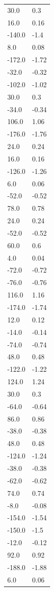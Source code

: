 \begin{longtable}{ll}
30.0 & 0.3 \\
16.0 & 0.16 \\
-140.0 & -1.4 \\
8.0 & 0.08 \\
-172.0 & -1.72 \\
-32.0 & -0.32 \\
-102.0 & -1.02 \\
30.0 & 0.3 \\
-34.0 & -0.34 \\
106.0 & 1.06 \\
-176.0 & -1.76 \\
24.0 & 0.24 \\
16.0 & 0.16 \\
-126.0 & -1.26 \\
6.0 & 0.06 \\
-52.0 & -0.52 \\
78.0 & 0.78 \\
24.0 & 0.24 \\
-52.0 & -0.52 \\
60.0 & 0.6 \\
4.0 & 0.04 \\
-72.0 & -0.72 \\
-76.0 & -0.76 \\
116.0 & 1.16 \\
-174.0 & -1.74 \\
12.0 & 0.12 \\
-14.0 & -0.14 \\
-74.0 & -0.74 \\
48.0 & 0.48 \\
-122.0 & -1.22 \\
124.0 & 1.24 \\
30.0 & 0.3 \\
-64.0 & -0.64 \\
86.0 & 0.86 \\
-38.0 & -0.38 \\
48.0 & 0.48 \\
-124.0 & -1.24 \\
-38.0 & -0.38 \\
-62.0 & -0.62 \\
74.0 & 0.74 \\
-8.0 & -0.08 \\
-154.0 & -1.54 \\
-150.0 & -1.5 \\
-12.0 & -0.12 \\
92.0 & 0.92 \\
-188.0 & -1.88 \\
6.0 & 0.06 \\

\end{longtable}
